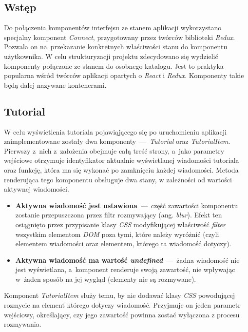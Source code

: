 \documentclass[12pt,a4paper,polish,thesis]{dcsbook}
\begin{document}
{	\subsection{Wstęp}

	Do połączenia komponentów interfejsu ze stanem aplikacji wykorzystano specjalny komponent \textit{Connect}, przygotowany przez twórców biblioteki \textit{Redux}. Pozwala on na~przekazanie konkretnych właściwości stanu do komponentu użytkownika. W celu strukturyzacji projektu zdecydowano się wydzielić komponenty połączone ze stanem do osobnego katalogu. Jest to praktyka popularna wśród twórców aplikacji opartych o \textit{React} i \textit{Redux}. Komponenty takie będą dalej nazywane kontenerami.

	\subsection{Tutorial}

	W celu wyświetlenia tutoriala pojawiąjącego się po uruchomieniu aplikacji zaimplementowane zostały dwa komponenty~---~\textit{Tutorial} oraz \textit{TutorialItem}. Pierwszy z~nich z~założenia obejmuje całą treść strony, a~jako parametry wejściowe otrzymuje identyfikator aktualnie wyświetlanej wiadomości tutoriala oraz funkcję, która ma się wykonać po zamknięciu każdej wiadomości. Metoda renderująca tego komponentu obsługuje dwa stany, w zależności od wartości aktywnej wiadomości. 
	\begin{itemize}
		\item \textbf{Aktywna wiadomość jest ustawiona}~---~część zawartości komponentu zostanie przepuszczona przez filtr rozmywający (ang. \textit{blur}). Efekt ten osiągnięto przez przypisanie klasy \textit{CSS} modyfikującej właściwość  \textit{filter} wszystkim elementom \textit{DOM} poza tymi, które należy wyróżnić (czyli elementem wiadomości oraz elementem, którego ta wiadomość dotyczy).
		\item \textbf{Aktywna wiadomość ma wartość \textit{undefined}}~---~żadna wiadomość nie jest wyświetlana, a~komponent renderuje swoją zawartość, nie wpływając w~żaden sposób na jej wygląd (elementy nie są rozmywane).
	\end{itemize}
	Komponent \textit{TutorialItem} służy temu, by nie dodawać klasy \textit{CSS} powodującej rozmycie na element którego dotyczy wiadomość. Przyjmuje on jeden parametr wejściowy, określający, czy jego zawartość powinna zostać wyłączona z procesu rozmywania.

}
\end{document}
